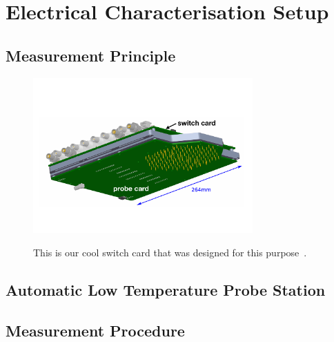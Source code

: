 \section{Electrical Characterisation Setup}
\label{sec:setup}

\subsection{Measurement Principle}
\label{subsec:setup_principle}
\begin{figure}[h]
	\centering
	\includegraphics[width=0.75\textwidth]{figures/example_switchprobecard.pdf}
	\label{fig:switchprobecard_CAD}
	\caption{
	This is our cool switch card that was designed for this purpose~\cite{pitters:array2019}.
	}
\end{figure}



\subsection{Automatic Low Temperature Probe Station}
\label{subsec:setup_ALPS}

\subsection{Measurement Procedure}
\label{subsec:setup_procedure}